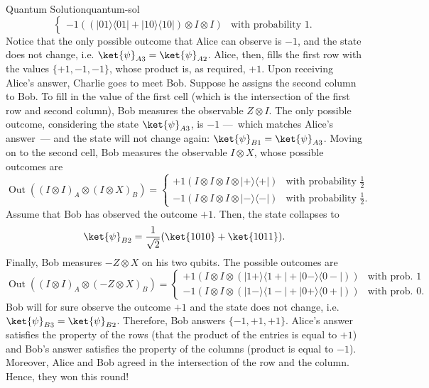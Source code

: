 \documentclass{llncs}
\newcommand{\ketbra}[2]{\ensuremath{| #1 \rangle \langle #2 |}}
\begin{document}
\begin{tcbexample}{Quantum Solution}{quantum-sol}
\begin{equation}
\begin{cases}
      -1 \left(\left(\ketbra{01}{01} + \ketbra{10}{10}\right) \otimes I \otimes I\right)
      &\text{with probability } 1.
    \end{cases}
  \end{equation}
  Notice that the only possible outcome that Alice can observe is
  \(-1\), and the state does not change, i.e.
  \(\ket{\psi}_{A3} = \ket{\psi}_{A2}\).  Alice, then, fills the first
  row with the values \(\{+1, -1, -1\}\), whose product is, as
  required, \(+1\). Upon receiving Alice's answer, Charlie goes to
  meet Bob. Suppose he assigns the second column to Bob. To fill in
  the value of the first cell (which is the intersection of the first
  row and second column), Bob measures the observable \(Z \otimes
  I\). The only possible outcome, considering the state
  \(\ket{\psi}_{A3}\), is \(-1\) ---~which matches Alice's answer~---
  and the state will not change again:
  \(\ket{\psi}_{B1} = \ket{\psi}_{A3}\). Moving on to the second cell,
  Bob measures the observable \(I \otimes X\), whose possible outcomes
  are
  \begin{equation}
    \operatorname{Out}((I \otimes I)_{A} \otimes (I \otimes X)_{B}) =
    \begin{cases}
      +1 \left(I \otimes I \otimes I \otimes \ketbra{+}{+}\right)
      &\text{with probability } \frac{1}{2} \\
      -1 \left(I \otimes I \otimes I \otimes \ketbra{-}{-}\right)
      &\text{with probability } \frac{1}{2}.
    \end{cases}
  \end{equation}
  Assume that Bob has observed the outcome \(+1\). Then, the state
  collapses to
  \begin{equation}
    \ket{\psi}_{B2} =  \frac{1}{\sqrt{2}}(\ket{1010} + \ket{1011}).
  \end{equation}
  Finally, Bob measures \(-Z \otimes X\) on his two qubits.
  The possible outcomes are
  \begin{equation}
    \operatorname{Out}((I \otimes I)_{A} \otimes (-Z \otimes X)_{B}) =
    \begin{cases}
      +1 \left(I \otimes I \otimes \left(\ketbra{1+}{1\!+\!} + \ketbra{0-}{0\!-\!}\right)\right)
      &\text{with prob. } 1 \\
      -1 \left(I \otimes I \otimes \left(\ketbra{1-}{1\!-\!} + \ketbra{0+}{0\!+\!}\right)\right)
      &\text{with prob. } 0.
    \end{cases}
  \end{equation}
  Bob will for sure observe the outcome \(+1\) and the state does not
 change, i.e.  \(\ket{\psi}_{B3} = \ket{\psi}_{B2}\). Therefore, Bob
  answers \(\{-1, +1, +1\}\). Alice's answer satisfies the property of
  the rows (that the product of the entries is equal to \(+1\)) and
  Bob's answer satisfies the property of the columns (product is equal
  to \(-1\)).  Moreover, Alice and Bob agreed in the intersection of
  the row and the column.  Hence, they won this round!
\end{tcbexample}
\end{document}
